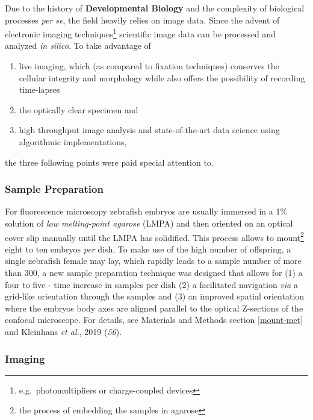 \documentclass[10pt, b5paper, singlespacinge, twoside]{reedthesis} %
\providecommand{\tightlist}{%
  \setlength{\itemsep}{0pt}\setlength{\parskip}{0pt}}
\theoremstyle{definition}
\theoremstyle{definition}
\theoremstyle{definition}
\theoremstyle{remark}
\begin{document}
Due to the history of \textbf{Developmental Biology} and the complexity of biological processes \emph{per se}, the field heavily relies on image data. Since the advent of electronic imaging techniques\footnote{e.g.~photomultipliers or charge-coupled devices} scientific image data can be processed and analyzed \emph{in silico}. To take advantage of
\begin{enumerate}
\def\labelenumi{\arabic{enumi}.}
\tightlist
\item
  live imaging, which (as compared to fixation techniques) conserves the cellular integrity and morphology while also offers the possibility of recording time-lapses
\item
  the optically clear specimen and
\item
  high throughput image analysis and state-of-the-art data science using algorithmic implementations,
\end{enumerate}
the three following points were paid special attention to.

\hypertarget{sample-preparation}{%
\subsubsection{Sample Preparation}\label{sample-preparation}}

For fluorescence microscopy zebrafish embryos are usually immersed in a 1\(\%\) solution of \emph{low melting-point agarose} (LMPA) and then oriented on an optical cover slip manually until the LMPA has solidified. This process allows to mount\footnote{the process of embedding the samples in agarose} eight to ten embryos \emph{per} dish. To make use of the high number of offspring, a single zebrafish female may lay, which rapidly leads to a sample number of more than 300, a new sample preparation technique was designed that allows for (1) a four to five - time increase in samples per dish (2) a facilitated navigation \emph{via} a grid-like orientation through the samples and (3) an improved spatial orientation where the embryos body axes are aligned parallel to the optical Z-sections of the confocal microscope. For details, see Materials and Methods section \ref{mount-met} and Kleinhans \emph{et al.}, 2019 (\emph{56}).

\hypertarget{imaging}{%
\subsubsection{Imaging}\label{imaging}}
\end{document}
